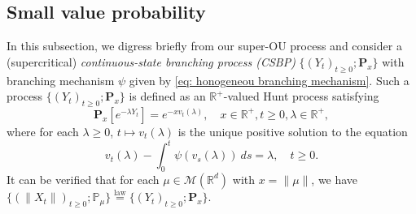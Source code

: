\documentclass[12pt,a4paper]{amsart}
\theoremstyle{plain}
\theoremstyle{definition}
\numberwithin{equation}{section}
\begin{document}
\begin{comment}
In particular, it contains the interval connecting $xe^{-bs}+y\sqrt{1-e^{-2bs}}$ with $y$ for each $s\geq 0$.
Also, note that $ | \sqrt { 1 - \theta } - 1 | \leq \theta $ for all $ \theta \in [ 0, 1 ] $, and that $ 1 + \theta + \lambda \leq ( 1 + \theta ) ( 1 + \lambda ) $ for all $ \theta, \lambda \geq 0$.
Using the fact that $\langle \bar{g}_t,\varphi\rangle = 0$, we get that for all $s,t\geq 0, x\in \mathbb R^d$,
\begin{align}
  & |P_s\bar{g}_t(x)|
    = \Big|\int_{\mathbb R^d} \big(\bar {g}_t(xe^{-bs}+y\sqrt{1-e^{-2bs}})-\bar {g}_t (y)\big) \varphi(y)~dy \Big| \\
  & \leq \int_{\mathbb R^d} \sup_{z\in D(x,y)} |\nabla \bar g_t (z)|\Big|xe^{-bs}+y\sqrt{1-e^{-2bs}}-y \Big| \varphi(y)~dy \\
  & \leq e^{-bs}\int_{\mathbb R^d} c(1+|x|+|y|)^n (|x|+|y|) \varphi(y)~dy \\
  & \leq ce^{-bs}(1+|x|)^n\Big(|x|\int_{\mathbb R^d} (1+|y|)^n\varphi(y)dy + \int_{\mathbb R^d}(1+|y|)^n|y|\varphi(y)dy\Big).
  \qedhere
\end{align}
\end{proof}
\end{comment}
\subsection{Small value probability}
\label{sec: Small value probability}
In this subsection, we digress briefly from our super-OU process and consider a (supercritical) \emph{continuous-state branching process (CSBP)} $\{(Y_t)_{t\geq 0}; \mathbf P_x\}$ with branching mechanism $\psi$ given by \eqref{eq: honogeneou branching mechanism}.
Such a process $\{(Y_t)_{t\geq 0}; \mathbf P_x\}$ is defined as an $\mathbb R^+$-valued Hunt process satisfying 
\[
  \mathbf P_x[e^{-\lambda Y_t}] = e^{- x v_t(\lambda)},
  \quad x\in \mathbb R^+, t\geq 0, \lambda \in \mathbb R^+,
\]
where for each $\lambda\geq 0$, $t\mapsto v_t(\lambda)$ is the unique positive solution to the equation
\begin{equation}
  \label{eq: fkpp equation for CSBP}
  v_t(\lambda) - \int_0^t \psi(v_s(\lambda))~ds = \lambda,
  \quad t\geq 0.
\end{equation}
It can be verified that for each $\mu \in \mathcal M(\mathbb R^d)$ with $x = \| \mu \|$, we have
\(
  \{(\|X_t\|)_{t\geq 0}; \mathbb P_\mu\}
  \overset{\text{law}}{=} \{(Y_t)_{t\geq 0}; \mathbf P_x\}.
\)
\end{document}
